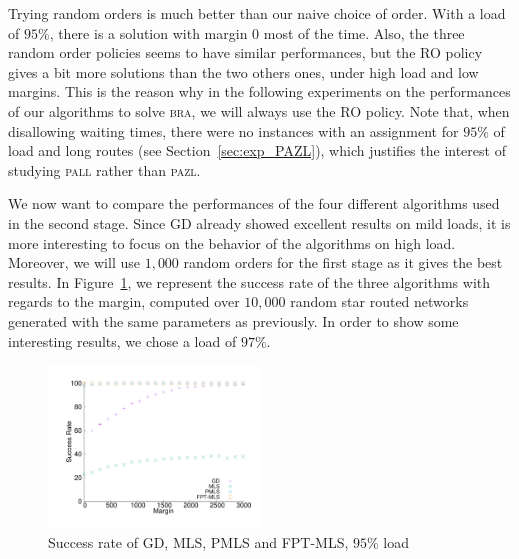 \documentclass[10pt, conference, letterpaper]{IEEEtran}
\newcommand\pazl{\textsc{pazl}\xspace}
\newcommand\pall{\textsc{pall}\xspace}
\newcommand\bra{\textsc{bra}\xspace}
\begin{document}
     Trying random orders is much better than our naive choice of order.
     With a load of $95\%$, there is a solution with margin $0$ most of the time. Also, the three random order policies seems to have similar performances, but the RO policy gives a bit more solutions than the two others ones, under high load and low margins. This is the reason why in the following experiments on the performances of our algorithms to solve \bra, we will always use the RO policy.  Note that, when disallowing waiting times, there were no instances with an assignment for $95\%$ of load and long routes (see Section~\ref{sec:exp_PAZL}), which justifies the interest of studying \pall rather than \pazl.
     
      We now want to compare the performances of the four different algorithms used in the second stage. Since GD already showed excellent results on mild loads, it is more interesting to focus on the behavior of the algorithms on high load. Moreover, we will use $1,000$ random orders for the first stage as it gives the best results. In Figure~\ref{fig:success21000}, we represent the success rate of the three algorithms with regards to the margin,  computed over $10,000$ random star routed networks generated with the same parameters as previously. In order to show some interesting results, we chose a load of $97\%$.
     
    \begin{figure} [h] 
       \begin{center}
      \includegraphics[width=0.5\textwidth]{retour_21000.pdf}
      \end{center}
      \caption{Success rate of GD, MLS, PMLS and FPT-MLS, $95\%$ load}
     \label{fig:success21000}
     \end{figure}
\end{document}

